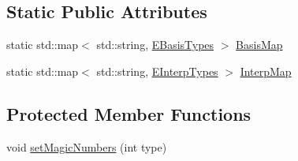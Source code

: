 \subsection*{Static Public Attributes}
\begin{DoxyCompactItemize}
\item 
static std::map$<$ std::string, \hyperlink{namespaceanl_ab7af374c31ed4646e3eac0ecedf32c28}{EBasisTypes} $>$ \hyperlink{classanl_1_1CImplicitBasisFunction_a51023c4a91ea9e150fe7e2deb24e2d8d}{BasisMap}
\item 
static std::map$<$ std::string, \hyperlink{namespaceanl_ad37644d3254289e61fdeb1221f25a4e8}{EInterpTypes} $>$ \hyperlink{classanl_1_1CImplicitBasisFunction_abdee5a732a3ef68456a3c7e6e9c38320}{InterpMap}
\end{DoxyCompactItemize}
\subsection*{Protected Member Functions}
\begin{DoxyCompactItemize}
\item 
void \hyperlink{classanl_1_1CImplicitBasisFunction_a398b6236011a569180b7a7479c7c8a49}{setMagicNumbers} (int type)
\end{DoxyCompactItemize}
